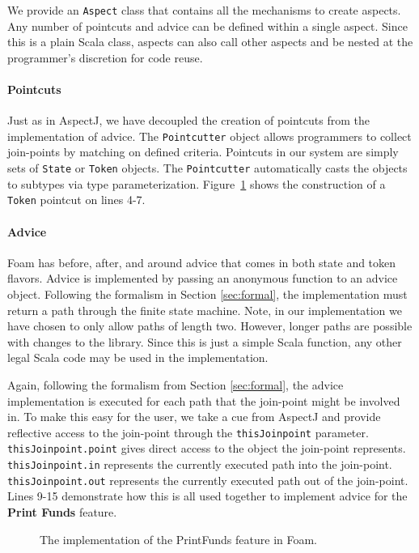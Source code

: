 \documentclass[sigplan,anonymous,review]{acmart}
\begin{document}
We provide an \texttt{Aspect} class that contains all the mechanisms to create aspects. Any number of pointcuts and advice can be defined within a single aspect. Since this is a plain Scala class, aspects can also call other aspects and be nested at the programmer's discretion for code reuse.

\paragraph{Pointcuts} Just as in AspectJ, we have decoupled the creation of pointcuts from the implementation of advice. The \texttt{Pointcutter} object allows programmers to collect join-points by matching on defined criteria. Pointcuts in our system are simply sets of \texttt{State} or \texttt{Token} objects. The \texttt{Pointcutter} automatically casts the objects to subtypes via type parameterization. Figure~\ref{lst:PrintFunds} shows the construction of a \texttt{Token} pointcut on lines 4-7.

\paragraph{Advice} Foam has before, after, and around advice that comes in both state and token flavors. Advice is implemented by passing an anonymous function to an advice object. Following the formalism in Section \ref{sec:formal}, the implementation must return a path through the finite state machine. Note, in our implementation we have chosen to only allow paths of length two. However, longer paths are possible with changes to the library. Since this is just a simple Scala function, any other legal Scala code may be used in the implementation. 

Again, following the formalism from Section \ref{sec:formal}, the advice implementation is executed for each path that the join-point might be involved in. To make this easy for the user, we take a cue from AspectJ and provide reflective access to the join-point through the \texttt{thisJoinpoint} parameter. \texttt{thisJoinpoint.point} gives direct access to the object the join-point represents. \texttt{thisJoinpoint.in} represents the currently executed path into the join-point. \texttt{thisJoinpoint.out} represents the currently executed path out of the join-point. Lines 9-15 demonstrate how this is all used together to implement advice for the \textbf{Print Funds} feature.

\begin{figure}
    \centering
    
    \caption{The implementation of the PrintFunds feature in Foam.}
    \label{lst:PrintFunds}
\end{figure}
\end{document}
